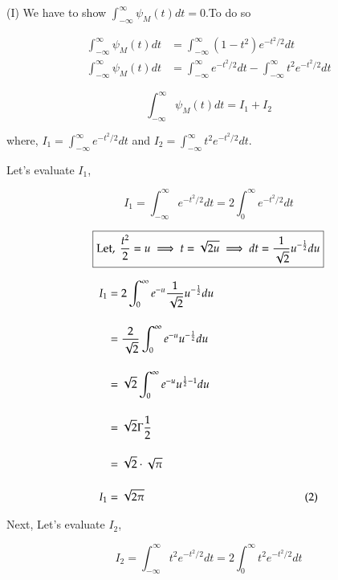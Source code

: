 \documentclass[12pt, a4paper]{article} %
\begin{document}
(I) We have to show $\displaystyle \int_{-\infty}^{\infty}\psi_M(t)dt = 0$.To do so

\begin{equation*}
    \begin{split}
        \int_{-\infty}^{\infty}\psi_M(t)dt  & = \int_{-\infty}^{\infty}(1-t^2)e^{-t^2/2}dt\\[4mm]
        \int_{-\infty}^{\infty}\psi_M(t)dt & = \int_{-\infty}^{\infty}e^{-t^2/2}dt -  \int_{-\infty}^{\infty}t^2e^{-t^2/2}dt
    \end{split}
\end{equation*}

\begin{equation*}
    \int_{-\infty}^{\infty}\psi_M(t)dt = I_1 + I_2 \tag*{(1)}
\end{equation*}

\begin{center}
    where, $\displaystyle I_1 = \int_{-\infty}^{\infty}e^{-t^2/2}dt$ and $\displaystyle I_2 = \int_{-\infty}^{\infty}t^2e^{-t^2/2}dt$.
\end{center}

Let's evaluate $I_1$,


\[I_1 = \int_{-\infty}^{\infty}e^{-t^2/2}dt  = 2\int_{0}^{\infty}e^{-t^2/2}dt\]

\[\boxed{\mbox{Let}, \ \frac{t^2}{2} = u\\
\implies t = \sqrt{2u}\\
\implies dt = \frac{1}{\sqrt{2}}u^{-\frac{1}{2}}du}\]

\begin{equation*}
    \begin{split}
        I_1 & = 2\int_{0}^{\infty}e^{-u}\frac{1}{\sqrt{2}}u^{-\frac{1}{2}}du\\[4mm]
        & = \frac{2}{\sqrt{2}}\int_{0}^{\infty}e^{-u}u^{-\frac{1}{2}}du\\[4mm]
        & = \sqrt{2}\int_{0}^{\infty}e^{-u}u^{\frac{1}{2}-1}du\\[4mm]
        & = \sqrt{2}\Gamma\frac{1}{2}\\[4mm]
        & = \sqrt{2}\cdot\sqrt{\pi}\\[4mm]
        I_1  & = \sqrt{2\pi}\hspace*{5cm}(2)
    \end{split}
\end{equation*}

\BgThispage
Next, Let's evaluate $I_2$,

\[I_2 = \int_{-\infty}^{\infty}t^2e^{-t^2/2}dt  = 2\int_{0}^{\infty}t^2e^{-t^2/2}dt\]
\end{document}
